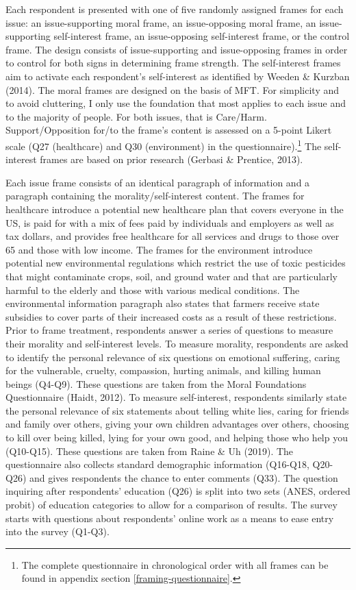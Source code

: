 \documentclass[12pt,econ]{sources/authesis}
\begin{document}
Each respondent is presented with one of five randomly assigned frames for each issue: an issue-supporting moral frame, an issue-opposing moral frame, an issue-supporting self-interest frame, an issue-opposing self-interest frame, or the control frame. The design consists of issue-supporting and issue-opposing frames in order to control for both signs in determining frame strength. The self-interest frames aim to activate each respondent's self-interest as identified by Weeden \& Kurzban (2014). The moral frames are designed on the basis of MFT. For simplicity and to avoid cluttering, I only use the foundation that most applies to each issue and to the majority of people. For both issues, that is Care/Harm. Support/Opposition for/to the frame's content is assessed on a 5-point Likert scale (Q27 (healthcare) and Q30 (environment) in the questionnaire).\footnote{The complete questionnaire in chronological order with all frames can be found in appendix section \ref{framing-questionnaire}.} The self-interest frames are based on prior research (Gerbasi \& Prentice, 2013).

Each issue frame consists of an identical paragraph of information and a paragraph containing the morality/self-interest content. The frames for healthcare introduce a potential new healthcare plan that covers everyone in the US, is paid for with a mix of fees paid by individuals and employers as well as tax dollars, and provides free healthcare for all services and drugs to those over 65 and those with low income. The frames for the environment introduce potential new environmental regulations which restrict the use of toxic pesticides that might contaminate crops, soil, and ground water and that are particularly harmful to the elderly and those with various medical conditions. The environmental information paragraph also states that farmers receive state subsidies to cover parts of their increased costs as a result of these restrictions.
Prior to frame treatment, respondents answer a series of questions to measure their morality and self-interest levels. To measure morality, respondents are asked to identify the personal relevance of six questions on emotional suffering, caring for the vulnerable, cruelty, compassion, hurting animals, and killing human beings (Q4-Q9). These questions are taken from the Moral Foundations Questionnaire (Haidt, 2012). To measure self-interest, respondents similarly state the personal relevance of six statements about telling white lies, caring for friends and family over others, giving your own children advantages over others, choosing to kill over being killed, lying for your own good, and helping those who help you (Q10-Q15). These questions are taken from Raine \& Uh (2019). The questionnaire also collects standard demographic information (Q16-Q18, Q20-Q26) and gives respondents the chance to enter comments (Q33). The question inquiring after respondents' education (Q26) is split into two sets (ANES, ordered probit) of education categories to allow for a comparison of results. The survey starts with questions about respondents' online work as a means to ease entry into the survey (Q1-Q3).
\end{document}
